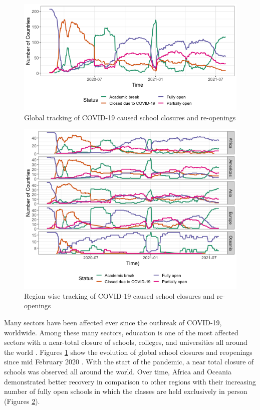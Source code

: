 \documentclass[11pt,a4paper,]{article}
\begin{document}
\begin{figure}[h]

{\centering \includegraphics[width=1\textwidth]{figure/covidImpactWorld-1} 

}

\caption{Global tracking of COVID-19 caused school closures and re-openings}\label{fig:covidImpactWorld}
\end{figure}

\begin{figure}[h]

{\centering \includegraphics[width=1\textwidth]{figure/covidImpactContinent-1} 

}

\caption{Region wise tracking of COVID-19 caused school closures and re-openings}\label{fig:covidImpactContinent}
\end{figure}

Many sectors have been affected ever since the outbreak of COVID-19, worldwide. Among these many sectors, education is one of the most affected sectors with a near-total closure of schools, colleges, and universities all around the world \autocite{daniel2020education}. Figures \ref{fig:covidImpactWorld} show the evolution of global school closures and reopenings since mid February 2020 \autocite{unesco2020covid}. With the start of the pandemic, a near total closure of schools was observed all around the world. Over time, Africa and Oceania demonstrated better recovery in comparison to other regions with their increasing number of fully open schools in which the classes are held exclusively in person (Figures \ref{fig:covidImpactContinent}).
\end{document}
